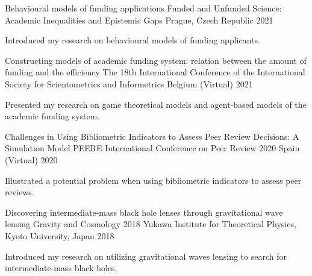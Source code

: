 

\begin{cventries}


  \cventry
    {Behavioural models of funding applications} %
    {Funded and Unfunded Science: Academic Inequalities and Epistemic Gaps} %
    {Prague, Czech Republic} %
    {2021} %
    {
      \begin{cvitems} %
        \item {Introduced my research on behavioural models of funding applicants.}
      \end{cvitems}
    }

  \cventry
    {Constructing models of academic funding system: relation between the amount of funding and the efficiency} %
    {The 18th International Conference of the International Society for Scientometrics and Informetrics} %
    {Belgium (Virtual)} %
    {2021} %
    {
      \begin{cvitems} %
        \item {Presented my research on game theoretical models and agent-based models of the academic funding system.}
      \end{cvitems}
    }

  \cventry
    {Challenges in Using Bibliometric Indicators to Assess Peer Review Decisions: A Simulation Model} %
    {PEERE International Conference on Peer Review 2020} %
    {Spain (Virtual)} %
    {2020} %
    {
      \begin{cvitems} %
        \item {Illustrated a potential problem when using bibliometric indicators to assess peer reviews.}
      \end{cvitems}
    }

  \cventry
    {Discovering intermediate‑mass black hole lenses through gravitational wave lensing} %
    {Gravity and Cosmology 2018} %
    {Yukawa Institute for Theoretical Physics, Kyoto University, Japan} %
    {2018} %
    {
      \begin{cvitems} %
        \item {Introduced my research on utilizing gravitational waves lensing to search for intermediate‑mass black holes.}
      \end{cvitems}
    }


\end{cventries}
